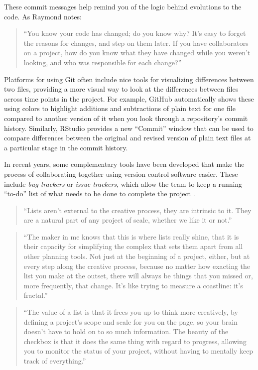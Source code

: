 \documentclass[]{tufte-book}
\begin{document}
These commit messages help remind you of the logic behind evolutions to the
code. As Raymond notes:

\begin{quote}
``You know your code has changed; do you know why? It's easy to forget the
reasons for changes, and step on them later. If you have collaborators on a
project, how do you know what they have changed while you weren't looking, and
who was responsible for each change?''
\end{quote}

Platforms for using Git often include nice tools for visualizing differences
between two files, providing a more visual way to look at the differences between
files across time points in the project. For example, GitHub automatically shows
these using colors to highlight additions and subtractions of plain text for
one file compared to another version of it when you look through a repository's
commit history. Similarly, RStudio provides a new ``Commit'' window that can be
used to compare differences between the original and revised version of plain
text files at a particular stage in the commit history.

In recent years, some complementary tools have been developed that make the
process of collaborating together using version control software easier. These
include \emph{bug trackers} or \emph{issue trackers}, which allow the team to keep a running ``to-do''
list of what needs to be done to complete the project \citep{perez2016ten}.

\begin{quote}
``Lists aren't external to the creative process, they are intrinsic to it. They are
a natural part of any project of scale, whether we like it or not.'' \citep{savage2020every}
\end{quote}

\begin{quote}
``The maker in me knows that this is where lists really shine, that it is their capacity
for simplifying the complex that sets them apart from all other planning tools.
Not just at the beginning of a project, either, but at every step along the
creative process, because no matter how exacting the list you make at the outset,
there will always be things that you missed or, more frequently, that change. It's
like trying to measure a coastline: it's fractal.'' \citep{savage2020every}
\end{quote}

\begin{quote}
``The value of a list is that it frees you up to think more creatively, by
defining a project's scope and scale for you on the page, so your brain doesn't
have to hold on to so much information. The beauty of the checkbox is that it
does the same thing with regard to progress, allowing you to monitor the status
of your project, without having to mentally keep track of everything.'' \citep{savage2020every}
\end{quote}
\end{document}
